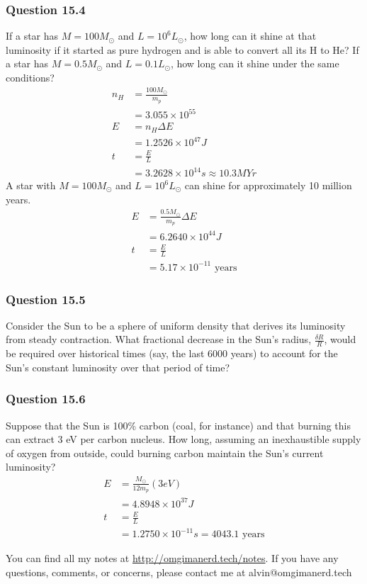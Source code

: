 \documentclass{math}
\begin{document}
\subsubsection*{Question 15.4}
If a star has \( M = 100M_{\odot} \) and \( L = 10^6L_{\odot} \), how long can
it shine at that luminosity if it started as pure hydrogen and is able to
convert all its H to He? If a star has \( M = 0.5M_{\odot} \) and
\( L = 0.1L_{\odot} \), how long can it shine under the same conditions?
\begin{align*}
  n_H &= \frac{100M_{\odot}}{m_p} \\
  &= 3.055\times10^{55} \\
  E &= n_H\Delta E \\
  &= 1.2526\times10^{47}J \\
  t &= \frac{E}{L} \\
  &= 3.2628\times10^{14}s \approx 10.3MYr
\end{align*}
A star with \( M = 100M_{\odot} \) and \( L = 10^6L_{\odot} \) can shine for
approximately 10 million years.
\begin{align*}
  E &= \frac{0.5M_{\odot}}{m_p}\Delta E \\
  &= 6.2640\times10^{44}J \\
  t &= \frac{E}{L} \\
  &= 5.17\times10^{-11}\text{ years}
\end{align*}

\subsubsection*{Question 15.5}
Consider the Sun to be a sphere of uniform density that derives its luminosity
from steady contraction. What fractional decrease in the Sun's radius,
\( \frac{\delta R}{R} \), would be required over historical times (say, the
last 6000 years) to account for the Sun's constant luminosity over that period
of time?

\subsubsection*{Question 15.6}
Suppose that the Sun is 100\% carbon (coal, for instance) and that burning this
can extract 3 eV per carbon nucleus. How long, assuming an inexhaustible
supply of oxygen from outside, could burning carbon maintain the Sun's current
luminosity?
\begin{align*}
  E &= \frac{M_{\odot}}{12m_p}(3 eV) \\
  &= 4.8948\times10^{37}J \\
  t &= \frac{E}{L} \\
  &= 1.2750\times10^{-11}s = 4043.1\text{ years}
\end{align*}

\begin{center}
  You can find all my notes at \url{http://omgimanerd.tech/notes}. If you have
  any questions, comments, or concerns, please contact me at
  alvin@omgimanerd.tech
\end{center}
\end{document}

